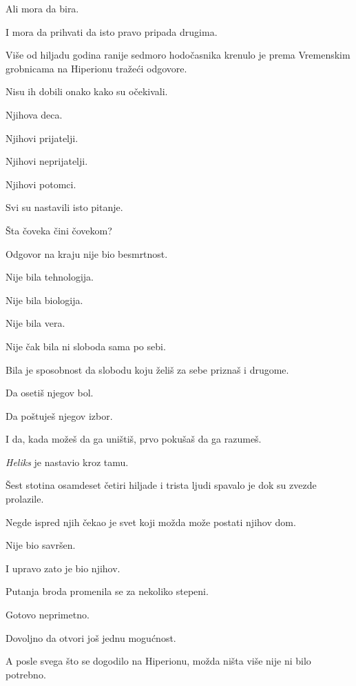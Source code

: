 \bigskip

Ali mora da bira.

\bigskip

I mora da prihvati da isto pravo pripada drugima.

\bigskip

Više od hiljadu godina ranije sedmoro hodočasnika krenulo je prema Vremenskim grobnicama na Hiperionu tražeći odgovore.

\bigskip

Nisu ih dobili onako kako su očekivali.

\bigskip

Njihova deca.

Njihovi prijatelji.

Njihovi neprijatelji.

Njihovi potomci.

\bigskip

Svi su nastavili isto pitanje.

\bigskip

Šta čoveka čini čovekom?

\bigskip

Odgovor na kraju nije bio besmrtnost.

\bigskip

Nije bila tehnologija.

Nije bila biologija.

Nije bila vera.

\bigskip

Nije čak bila ni sloboda sama po sebi.

\bigskip

Bila je sposobnost da slobodu koju želiš za sebe priznaš i drugome.

\bigskip

Da osetiš njegov bol.

Da poštuješ njegov izbor.

\bigskip

I da, kada možeš da ga uništiš, prvo pokušaš da ga razumeš.

\bigskip

\emph{Heliks} je nastavio kroz tamu.

\bigskip

Šest stotina osamdeset četiri hiljade i trista ljudi spavalo je dok su zvezde prolazile.

\bigskip

Negde ispred njih čekao je svet koji možda može postati njihov dom.

\bigskip

Nije bio savršen.

\bigskip

I upravo zato je bio njihov.

\bigskip

Putanja broda promenila se za nekoliko stepeni.

\bigskip

Gotovo neprimetno.

\bigskip

Dovoljno da otvori još jednu mogućnost.

\bigskip

A posle svega što se dogodilo na Hiperionu, možda ništa više nije ni bilo potrebno.